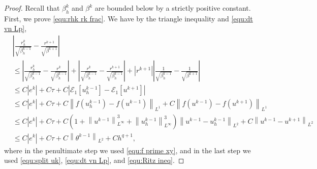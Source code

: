 \documentclass[11pt, reqno]{amsart}
\theoremstyle{definition}
\numberwithin{equation}{section}
\newcommand{\norm}[2]{\left\|{#1}\right\|_{#2}}
\newcommand{\abs}[1]{\left|{#1}\right|}
\begin{document}
\begin{proof}
Recall that $\beta_h^k$ and $\beta^k$ are bounded below by a strictly positive constant. First, we prove \eqref{equ:rhk rk frac}. We have by the triangle inequality and \eqref{equ:dt vn Lp},
\begin{align}\label{equ:rhk steps}
	&\abs{\frac{r_h^k}{\sqrt{\beta_h^{k-1}}} - \frac{r^{k+1}}{\sqrt{\beta^{k+1}}}}
	\nonumber\\
	&\leq
	\abs{\frac{r_h^k}{\sqrt{\beta_h^{k-1}}} - \frac{r^k}{\sqrt{\beta_h^{k-1}}}}
	+
	\abs{\frac{r^k}{\sqrt{\beta_h^{k-1}}} - \frac{r^{k+1}}{\sqrt{\beta_h^{k-1}}}}
	+
	\abs{r^{k+1}} \abs{\frac{1}{\sqrt{\beta_h^{k-1}}} - \frac{1}{\sqrt{\beta^{k+1}}}}
	\nonumber\\
	&\leq
	C\abs{e^k} + C\tau 
	+
	C \abs{\mathcal{E}_1[u_h^{k-1}]-\mathcal{E}_1[u^{k+1}]}
	\nonumber\\
	&\leq
	C\abs{e^k} +C\tau+ C\norm{f(u_h^{k-1})-f(u^{k-1})}{L^1}
	+
	C\norm{f(u^{k-1})-f(u^{k+1})}{L^1}
	\nonumber\\
	&\leq
	C\abs{e^k} +C\tau + C \left(1+\norm{u^{k-1}}{L^\infty}^3 + \norm{u_h^{k-1}}{L^\infty}^3 \right) \norm{u^{k-1}-u_h^{k-1}}{L^2}
	+
	C \norm{u^{k-1}-u^{k+1}}{L^2}
	\nonumber\\
	&\leq
	C\abs{e^k} + C\tau+ C\norm{\theta^{k-1}}{L^2} + Ch^{q+1},
\end{align}
where in the penultimate step we used \eqref{equ:f prime xy}, and in the last step we used \eqref{equ:split uk}, \eqref{equ:dt vn Lp}, and \eqref{equ:Ritz ineq}.


\end{proof}
\end{document}
